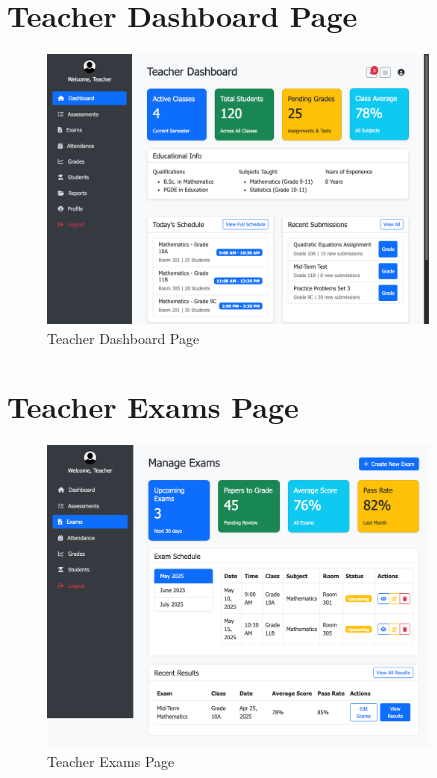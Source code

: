 \documentclass[12pt,a4paper]{report}
\begin{document}
\section{Teacher Dashboard Page}
\begin{figure}[htbp]
    \centering
    \includegraphics[width=0.9\textwidth]{teacher-dashboard-page.png}
    \caption{Teacher Dashboard Page}
    \label{fig:teacher-dashboard-page}
\end{figure}

\section{Teacher Exams Page}
\begin{figure}[htbp]
    \centering
    \includegraphics[width=0.9\textwidth]{teacher-exams-page.png}
    \caption{Teacher Exams Page}
    \label{fig:teacher-exams-page}
\end{figure}
\end{document}
